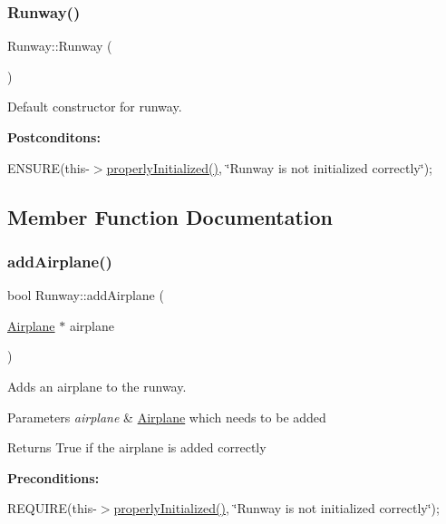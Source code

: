\subsubsection{\texorpdfstring{Runway()}{Runway()}\hspace{0.1cm}{\footnotesize\ttfamily [2/2]}}
{\footnotesize\ttfamily Runway\+::\+Runway (\begin{DoxyParamCaption}{ }\end{DoxyParamCaption})}



Default constructor for runway. 

{\bfseries Postconditons\+:}
\begin{DoxyItemize}
\item E\+N\+S\+U\+RE(this-\/$>$\mbox{\hyperlink{class_runway_a360d98246cabf3aa929765f81a656348}{properly\+Initialized()}}, \char`\"{}\+Runway is not initialized correctly\char`\"{}); 
\end{DoxyItemize}

\subsection{Member Function Documentation}
\mbox{\label{class_runway_ae07554e4e41faea8ef9654385449b25b}} 
\subsubsection{\texorpdfstring{add\+Airplane()}{addAirplane()}}
{\footnotesize\ttfamily bool Runway\+::add\+Airplane (\begin{DoxyParamCaption}\item[{\mbox{\hyperlink{class_airplane}{Airplane}} $\ast$}]{airplane }\end{DoxyParamCaption})}



Adds an airplane to the runway. 


\begin{DoxyParams}{Parameters}
{\em airplane} & \mbox{\hyperlink{class_airplane}{Airplane}} which needs to be added \\
\hline
\end{DoxyParams}
\begin{DoxyReturn}{Returns}
True if the airplane is added correctly
\end{DoxyReturn}
{\bfseries Preconditions\+:}
\begin{DoxyItemize}
\item R\+E\+Q\+U\+I\+RE(this-\/$>$\mbox{\hyperlink{class_runway_a360d98246cabf3aa929765f81a656348}{properly\+Initialized()}}, \char`\"{}\+Runway is not initialized correctly\char`\"{}); 
\end{DoxyItemize}\mbox{\label{class_runway_ae339230720ad45aa3997e90c2acaf744}} 
